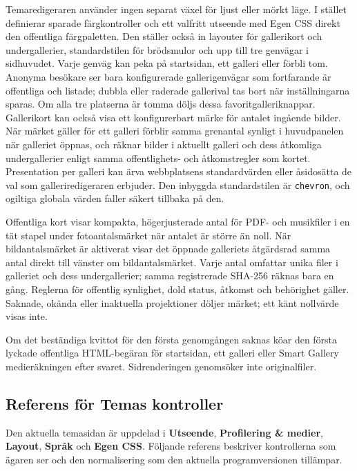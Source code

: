 \documentclass[11pt,a4paper]{article}
\newcommand{\ui}[1]{\textbf{#1}}
\newcommand{\codeword}[1]{\nolinkurl{#1}}
\begin{document}
Temaredigeraren använder ingen separat växel för ljust eller mörkt läge. I
stället definierar sparade färgkontroller och ett valfritt utseende med Egen CSS
direkt den offentliga färgpaletten. Den ställer också in layouter för
gallerikort och undergallerier, standardstilen för brödsmulor och upp till tre
genvägar i sidhuvudet. Varje genväg kan peka på startsidan, ett galleri eller
förbli tom. Anonyma besökare ser bara konfigurerade gallerigenvägar som
fortfarande är offentliga och listade; dubbla eller raderade gallerival tas bort
när inställningarna sparas. Om alla tre platserna är tomma döljs dessa
favoritgalleriknappar. Gallerikort kan också visa ett konfigurerbart märke för
antalet ingående bilder. När märket gäller för ett galleri förblir samma
grenantal synligt i huvudpanelen när galleriet öppnas, och räknar bilder i
aktuellt galleri och dess åtkomliga undergallerier enligt samma offentlighets-
och åtkomstregler som kortet. Presentation per galleri kan ärva webbplatsens
standardvärden eller åsidosätta de val som galleriredigeraren erbjuder. Den
inbyggda standardstilen är \codeword{chevron}, och ogiltiga globala värden
faller säkert tillbaka på den.

Offentliga kort visar kompakta, högerjusterade antal för PDF- och musikfiler i
en tät stapel under fotoantalsmärket när antalet är större än noll. När
bildantalsmärket är aktiverat visar det öppnade galleriets åtgärdsrad samma
antal direkt till vänster om bildantalsmärket. Varje antal omfattar unika filer
i galleriet och dess undergallerier; samma registrerade SHA-256 räknas bara en
gång. Reglerna för offentlig synlighet, dold status, åtkomst och behörighet
gäller. Saknade, okända eller inaktuella projektioner döljer märket; ett känt
nollvärde visas inte.

Om det beständiga kvittot för den första genomgången saknas köar den första
lyckade offentliga HTML-begäran för startsidan, ett galleri eller Smart Gallery
medieräkningen efter svaret. Sidrenderingen genomsöker inte originalfiler.

\subsection{Referens för Temas kontroller}

Den aktuella temasidan är uppdelad i \ui{Utseende}, \ui{Profilering \& medier},
\ui{Layout}, \ui{Språk} och \ui{Egen CSS}. Följande referens beskriver
kontrollerna som ägaren ser och den normalisering som den aktuella
programversionen tillämpar.
\end{document}
